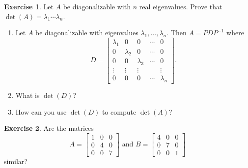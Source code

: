 \documentclass{beamer}
\newcommand{\fn}{\insertframenumber}
\theoremstyle{definition}
\newtheorem{exercise}{Exercise}
\begin{document}
\begin{frame}{\fn}
	\begin{exercise}
		Let $A$ be diagonalizable with $n$ real eigenvalues. Prove that $\det(A)=\lambda_1\cdots\lambda_n$.
		\begin{enumerate}[label=(\alph*)]
			\item Let $A$ be diagonalizable with eigenvalues $\lambda_1,\dots,\lambda_n$.  Then $A=PDP^{-1}$ where
				\[D=\begin{bmatrix}\lambda_1&0&0&\cdots&0\\0&\lambda_2&0&\cdots&0\\0&0&\lambda_3&\cdots&0\\\vdots&\vdots&\vdots&&\vdots\\0&0&0&\cdots&\lambda_n\end{bmatrix}.\]
			\item What is $\det(D)$?
			\item How can you use $\det(D)$ to compute $\det(A)$?
		\end{enumerate}
	\end{exercise}
\end{frame}
\begin{frame}{\fn}
	\begin{exercise}
		Are the matrices 
			\[A=\begin{bmatrix}1&0&0\\0&4&0\\0&0&7\end{bmatrix}\text{ and }B=\begin{bmatrix}4&0&0\\0&7&0\\0&0&1\end{bmatrix}\]
		similar?
	\end{exercise}
\end{frame}
\end{document}
